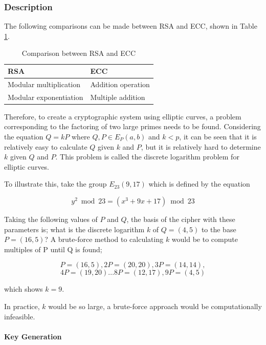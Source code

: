 \documentclass[a4paper,12pt]{report}
\begin{document}
\subsubsection{Description}

The following comparisons can be made between RSA and ECC, shown in Table \ref{tab:eccrsa}.

\begin{table}[htb]
\begin{center}
    \begin{tabular}{| l | l | }
    \hline
    RSA & ECC\\ \hline
    Modular multiplication & Addition operation \\ \hline
    Modular exponentiation & Multiple addition \\
    \hline
    \end{tabular}
   \caption{Comparison between RSA and ECC}
    \label{tab:eccrsa}
\end{center}
\end{table} 

Therefore, to create a cryptographic system using elliptic curves, a problem corresponding to the factoring of two large primes needs to be found. Considering the equation $Q = kP$ where $Q, P \in E_{P}(a,b)$ and $k < p$, it can be seen that it is relatively easy to calculate $Q$ given $k$ and $P$, but it is relatively hard to determine $k$ given $Q$ and $P$. This problem is called the discrete logarithm problem for elliptic curves. 

To illustrate this, take the group $E_{23}(9,17)$ which is defined by the equation

\[ y^2 \bmod 23 = (x^3 + 9x + 17) \bmod 23 \]

Taking the following values of $P$ and $Q$, the basis of the cipher with these parameters is; what is the discrete logarithm $k$ of $Q = (4,5)$ to the base $P = (16,5)$? A brute-force method to calculating $k$ would be to compute multiples of P until Q is found;

\[ P = (16,5), 2P = (20,20), 3P = (14,14), \]
\[ 4P = (19,20) ... 8P = (12,17), 9P = (4,5) \]

which shows $k = 9$. 

In practice, $k$ would be so large, a brute-force approach would be computationally infeasible. 

\paragraph{Key Generation}
\end{document}
